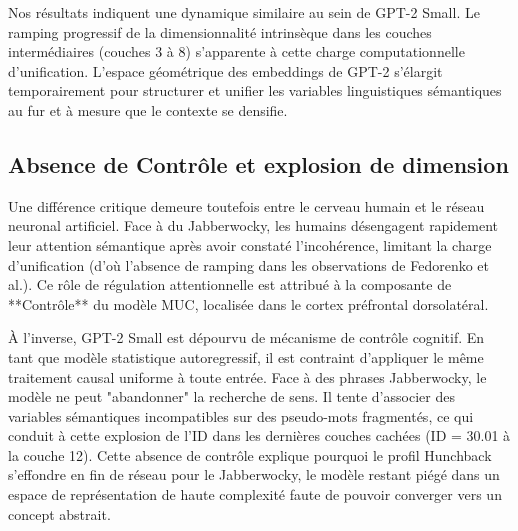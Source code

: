 Nos résultats indiquent une dynamique similaire au sein de GPT-2 Small. Le ramping progressif de la dimensionnalité intrinsèque dans les couches intermédiaires (couches 3 à 8) s'apparente à cette charge computationnelle d'unification. L'espace géométrique des embeddings de GPT-2 s'élargit temporairement pour structurer et unifier les variables linguistiques sémantiques au fur et à mesure que le contexte se densifie.

\subsection{Absence de Contrôle et explosion de dimension}
Une différence critique demeure toutefois entre le cerveau humain et le réseau neuronal artificiel. Face à du Jabberwocky, les humains désengagent rapidement leur attention sémantique après avoir constaté l'incohérence, limitant la charge d'unification (d'où l'absence de ramping dans les observations de Fedorenko et al.). Ce rôle de régulation attentionnelle est attribué à la composante de **Contrôle** du modèle MUC, localisée dans le cortex préfrontal dorsolatéral.

À l'inverse, GPT-2 Small est dépourvu de mécanisme de contrôle cognitif. En tant que modèle statistique autoregressif, il est contraint d'appliquer le même traitement causal uniforme à toute entrée. Face à des phrases Jabberwocky, le modèle ne peut "abandonner" la recherche de sens. Il tente d'associer des variables sémantiques incompatibles sur des pseudo-mots fragmentés, ce qui conduit à cette explosion de l'ID dans les dernières couches cachées (ID = 30.01 à la couche 12). Cette absence de contrôle explique pourquoi le profil Hunchback s'effondre en fin de réseau pour le Jabberwocky, le modèle restant piégé dans un espace de représentation de haute complexité faute de pouvoir converger vers un concept abstrait.
